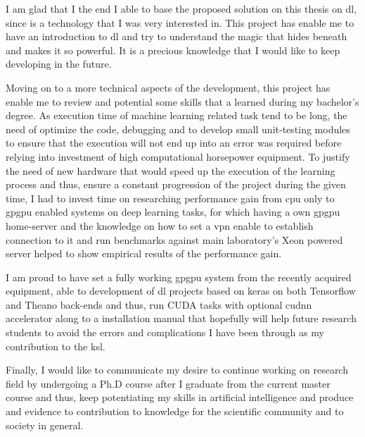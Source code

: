 I am glad that I the end I able to base the proposed solution on this thesis on \acrshort{dl}, since is a technology that I was very interested in. This project has enable me to have an introduction to \acrshort{dl} and try to understand the magic that hides beneath and makes it so powerful. It is a precious knowledge that I would like to keep developing in the future.

Moving on to a more technical aspects of the development, this project has enable me to review and potential some skills that a learned during my bachelor's degree. As execution time of machine learning related task tend to be long, the need of optimize the code, debugging and to develop small unit-testing modules to ensure that the execution will not end up into an error was required before relying into investment of high computational horsepower equipment. To justify the need of new hardware that would speed up the execution of the learning process and thus, ensure a constant progression of the project during the given time, I had to invest time on researching performance gain from \acrshort{cpu} only to \acrshort{gpgpu} enabled systems on deep learning tasks, for which having a own \acrshort{gpgpu} home-server and the knowledge on how to set a \acrshort{vpn} enable to establish connection to it and run benchmarks against main laboratory's Xeon powered server helped to show empirical results of the performance gain.

I am proud to have set a fully working \acrshort{gpgpu} system from the recently acquired equipment, able to development of \acrshort{dl} projects based on keras \cite{keras} on both Tensorflow and Theano back-ends and thus, run CUDA tasks with optional \acrshort{cudnn} accelerator \cite{chetlur2014cudnn} along to a installation manual that hopefully will help future research students to avoid the errors and complications I have been through as my contribution to the \acrfull{ksl}.

Finally, I would like to communicate my desire to continue working on research field by undergoing a Ph.D course after I graduate from the current master course and thus, keep potentiating my skills in artificial intelligence and produce and evidence to contribution to knowledge for the scientific community and to society in general.
